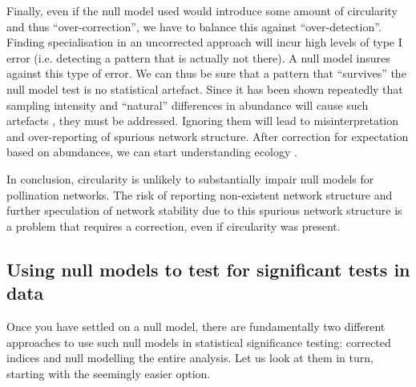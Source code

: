 \documentclass[a4paper, 11pt]{article}\usepackage[]{graphicx}\usepackage[]{color}
\begin{document}
Finally, even if the null model used would introduce some amount of circularity and thus ``over-correction'', we have to balance this against ``over-detection''. Finding specialisation in an uncorrected approach will incur high levels of type I error (i.e. detecting a pattern that is actually not there). A null model insures against this type of error. We can thus be sure that a pattern that ``survives'' the null model test is no statistical artefact. Since it has been shown repeatedly that sampling intensity and ``natural'' differences in abundance will cause such artefacts \citep{Dormann2009,Bluthgen2010,Joppa2009,Bluthgen2008}, they must be addressed. Ignoring them will lead to misinterpretation and over-reporting of spurious network structure. After correction for expectation based on abundances, we can start understanding ecology \citep{Vazquez2007}.

In conclusion, circularity is unlikely to substantially impair null models for pollination networks. The risk of reporting non-existent network structure and further speculation of network stability due to this spurious network structure is a problem that requires a correction, even if circularity was present.



\subsection{Using null models to test for significant tests in data}\label{sec:nullmodels}
Once you have settled on a null model, there are fundamentally two different approaches to use such null models in statistical significance testing: corrected indices and null modelling the entire analysis. Let us look at them in turn, starting with the seemingly easier option.
\end{document}
